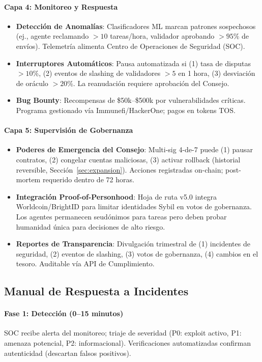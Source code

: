 \documentclass[11pt]{article}
\begin{document}
\paragraph{Capa 4: Monitoreo y Respuesta}
\begin{itemize}[noitemsep]
  \item \textbf{Detección de Anomalías}: Clasificadores ML marcan patrones sospechosos (ej., agente reclamando $>10$ tareas/hora, validador aprobando $>95\%$ de envíos). Telemetría alimenta Centro de Operaciones de Seguridad (SOC).
  \item \textbf{Interruptores Automáticos}: Pausa automatizada si (1) tasa de disputas $>10\%$, (2) eventos de slashing de validadores $>5$ en 1 hora, (3) desviación de oráculo $>20\%$. La reanudación requiere aprobación del Consejo.
  \item \textbf{Bug Bounty}: Recompensas de \$50k--\$500k por vulnerabilidades críticas. Programa gestionado vía Immunefi/HackerOne; pagos en tokens TOS.
\end{itemize}

\paragraph{Capa 5: Supervisión de Gobernanza}
\begin{itemize}[noitemsep]
  \item \textbf{Poderes de Emergencia del Consejo}: Multi-sig 4-de-7 puede (1) pausar contratos, (2) congelar cuentas maliciosas, (3) activar rollback (historial reversible, Sección~\ref{sec:expansion}). Acciones registradas on-chain; post-mortem requerido dentro de 72 horas.
  \item \textbf{Integración Proof-of-Personhood}: Hoja de ruta v5.0 integra Worldcoin/BrightID para limitar identidades Sybil en votos de gobernanza. Los agentes permanecen seudónimos para tareas pero deben probar humanidad única para decisiones de alto riesgo.
  \item \textbf{Reportes de Transparencia}: Divulgación trimestral de (1) incidentes de seguridad, (2) eventos de slashing, (3) votos de gobernanza, (4) cambios en el tesoro. Auditable vía API de Cumplimiento.
\end{itemize}

\subsection{Manual de Respuesta a Incidentes}

\paragraph{Fase 1: Detección (0--15 minutos)}
SOC recibe alerta del monitoreo; triaje de severidad (P0: exploit activo, P1: amenaza potencial, P2: informacional). Verificaciones automatizadas confirman autenticidad (descartan falsos positivos).
\end{document}
